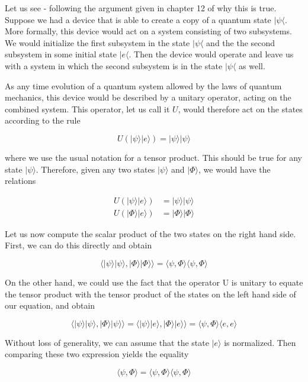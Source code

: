 \documentclass[a4paper, draft]{article}
\theoremstyle{own}
\theoremstyle{remark}
\begin{document}
Let us see - following the argument given in chapter 12 of \cite{NC} why this is true. Suppose we had a device that is able to create a copy of a quantum state $|\psi \langle $. More formally, this device would act on a system consisting of two subsystems. We would initialize the first subsystem in the state $|\psi\langle$ and the the second subsystem in some initial state $|e \langle$. Then the device would operate and leave us with a system in which the second subsystem is in the state $|\psi \langle$ as well.

As any time evolution of a quantum system allowed by the laws of quantum mechanics, this device would be described by a unitary operator, acting on the combined system. This operator, let us call it $U$, would therefore act on the states according to the rule

$$
U(|\psi \rangle |e \rangle) = |\psi \rangle |\psi \rangle
$$

where we use the usual notation for a tensor product. This should be true for any state $|\psi \rangle$. Therefore, given any two states $|\psi \rangle$ and $|\Phi \rangle$, we would have the relations

\begin{align*}
U(|\psi \rangle |e \rangle) &= |\psi \rangle |\psi \rangle \\
U(|\Phi \rangle |e \rangle) &= |\Phi \rangle |\Phi \rangle
\end{align*}

Let us now compute the scalar product of the two states on the right hand side. First, we can do this directly and obtain

$$
\langle |\psi \rangle |\psi \rangle , |\Phi \rangle |\Phi \rangle \rangle 
=
\langle \psi, \Phi \rangle \langle \psi, \Phi \rangle
$$

On the other hand, we could use the fact that the operator U is unitary to equate the tensor product with the tensor product of the states on the left hand side of our equation, and obtain 

$$
\langle |\psi \rangle |\psi \rangle , |\Phi \rangle |\psi \rangle \rangle 
=
\langle |\psi \rangle |e \rangle , |\Phi \rangle |e \rangle \rangle 
= 
\langle \psi, \Phi \rangle  \langle e, e \rangle
$$

Without loss of generality, we can assume that the state  $|e \rangle$ is normalized. Then comparing these two expression yields the equality

$$
\langle \psi, \Phi \rangle   = \langle \psi, \Phi \rangle \langle \psi, \Phi \rangle
$$
\end{document}
